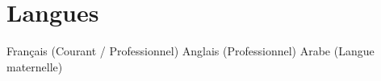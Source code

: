 \documentclass[letterpaper,9pt]{article}
\begin{document}
\section{Langues}
\begin{itemize}[leftmargin=0.18in, label={}, topsep=2pt, itemsep=1pt, parsep=0pt]
\footnotesize{
  \item Français (Courant / Professionnel) \textperiodcentered{} Anglais (Professionnel) \textperiodcentered{} Arabe (Langue maternelle)
}
\end{itemize}
\end{document}
